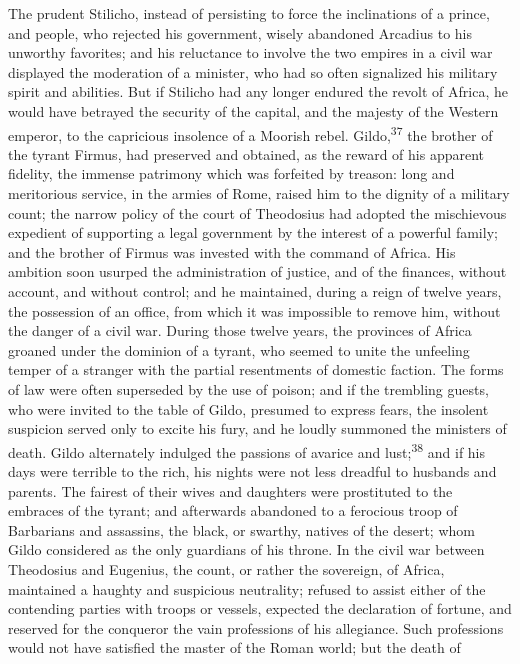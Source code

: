 The prudent Stilicho, instead of persisting to force the
inclinations of a prince, and people, who rejected his
government, wisely abandoned Arcadius to his unworthy favorites;
and his reluctance to involve the two empires in a civil war
displayed the moderation of a minister, who had so often
signalized his military spirit and abilities. But if Stilicho had
any longer endured the revolt of Africa, he would have betrayed
the security of the capital, and the majesty of the Western
emperor, to the capricious insolence of a Moorish rebel. Gildo,\textsuperscript{37}
the brother of the tyrant Firmus, had preserved and obtained,
as the reward of his apparent fidelity, the immense patrimony
which was forfeited by treason: long and meritorious service, in
the armies of Rome, raised him to the dignity of a military
count; the narrow policy of the court of Theodosius had adopted
the mischievous expedient of supporting a legal government by the
interest of a powerful family; and the brother of Firmus was
invested with the command of Africa. His ambition soon usurped
the administration of justice, and of the finances, without
account, and without control; and he maintained, during a reign
of twelve years, the possession of an office, from which it was
impossible to remove him, without the danger of a civil war.
During those twelve years, the provinces of Africa groaned under
the dominion of a tyrant, who seemed to unite the unfeeling
temper of a stranger with the partial resentments of domestic
faction. The forms of law were often superseded by the use of
poison; and if the trembling guests, who were invited to the
table of Gildo, presumed to express fears, the insolent suspicion
served only to excite his fury, and he loudly summoned the
ministers of death. Gildo alternately indulged the passions of
avarice and lust;\textsuperscript{38} and if his days were terrible to the rich,
his nights were not less dreadful to husbands and parents. The
fairest of their wives and daughters were prostituted to the
embraces of the tyrant; and afterwards abandoned to a ferocious
troop of Barbarians and assassins, the black, or swarthy, natives
of the desert; whom Gildo considered as the only guardians of his
throne. In the civil war between Theodosius and Eugenius, the
count, or rather the sovereign, of Africa, maintained a haughty
and suspicious neutrality; refused to assist either of the
contending parties with troops or vessels, expected the
declaration of fortune, and reserved for the conqueror the vain
professions of his allegiance. Such professions would not have
satisfied the master of the Roman world; but the death of
